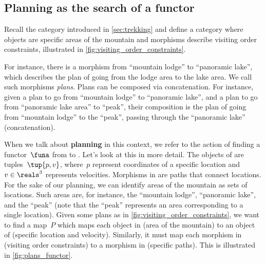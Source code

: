 \subsection{Planning as the search of a functor}

\begin{example}
	\label{ex:planning-as-search-functor}
	Recall the category \Berg introduced in \cref{sec:trekking} and define a category \Plans where objects are specific areas of the mountain and morphisms describe visiting order constraints, illustrated in \cref{fig:visiting_order_constraints}.

	For instance, there is a morphism from ``mountain lodge'' to ``panoramic lake'', which describes the plan of going from the lodge area to the lake area.
	We call such morphisms \emph{plans}.
	Plans can be composed via concatenation.
	For instance, given a plan to go from ``mountain lodge'' to ``panoramic lake'', and a plan to go from ``panoramic lake area'' to ``peak'', their composition is the plan of going from ``mountain lodge'' to the ``peak'', passing through the ``panoramic lake'' (concatenation).

	When we talk about \textbf{planning} in this context, we refer to the action of finding a functor~$\funa$ from \Plans to \Berg.
	Let's look at this in more detail.
	The objects of \Berg are tuples~$\tup{p,v}$, where~$p$ represent coordinates of a specific location and~$v\in \reals^3$ represents velocities.
	Morphisms in \Berg are paths that connect locations.
	For the sake of our planning, we can identify areas of the mountain as sets of locations.
	Such areas are, for instance, the ``mountain lodge'', ``panoramic lake'', and the
	``peak'' (note that the ``peak'' represents an area corresponding to a single location).
	Given some plans as in \cref{fig:visiting_order_constraints}, we want to find a map~$P$ which maps each object in \Plans (area of the mountain) to an object of \Berg (specific location and velocity).
	Similarly, it must map each morphism in \Plans (visiting order constraints) to a morphism in \Berg (specific paths).
	This is illustrated in \cref{fig:plans_functor}.
\end{example}

\begin{figure*}[h!]
	\centering
	\caption{Planning functor.}
	\label{fig:plans_functor}
\end{figure*}
